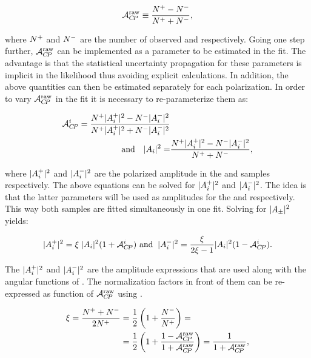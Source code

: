 \begin{equation}
\mathcal{A}_{C\!P}^{\text{raw}} \equiv \frac{{N^+} - {N^-}}{{N^+} + {N^-}},
\label{acp_mes}
\end{equation}

\noindent where ${N^+}$ and ${N^-}$ are the number of observed \BsbarJpsiKst and \BsJpsiKst respectively.
Going one step further, $\mathcal{A}_{C\!P}^{\text{raw}}$ can be implemented as a parameter to be estimated in the fit. The advantage
is that the statistical uncertainty propagation for these parameters is implicit in the likelihood thus avoiding
explicit calculations. In addition, the above quantities can then be estimated separately for each polarization.
In order to vary $\mathcal{A}_{C\!P}^{\text{raw}}$ in the fit it is necessary to re-parameterize them as:

\begin{align}
  \label{acp_param}
\mathcal{A}_{C\!P}^{i} = \frac{{N^+}|{A}_{i}^+|^2 - {N^-}|{A}_{i}^-|^2}{{N^+}|{A}_{i}^+|^2 + {N^-}|{A}_{i}^-|^2 } & \\
\text{and} \quad |{A}_{i}|^2 = &\frac{ {N^+} |{A}_{i}^+|^2 - {N^-}|{A}_{i}^-|^2}{{N^+} + {N^-}},
\end{align}

\noindent where $|{A}_{i}^+|^2$ and $|{A}_{i}^-|^2$ are the polarized amplitude in the \BsbarJpsiKst
and \BsJpsiKst samples respectively. The above equations can be solved for $|{A}_{i}^+|^2$ and $|{A}_{i}^-|^2$. The idea
is that the latter parameters will be used as amplitudes for the \BsbarJpsiKst and \BsJpsiKst \pdfs respectively.
This way both samples are fitted simultaneously in one fit. Solving  for $|{A}_{\pm}|^2$ yields:

\begin{equation}
|{A}_{i}^+|^2 = \xi \; |{A}_{i}|^2 (1+\mathcal{A}_{C\!P}^{i}) \,\, \text{and}\;\; |{A}_{i}^-|^2 = \frac{\xi}{2\xi-1} |{A}_{i}|^2 (1-\mathcal{A}_{C\!P}^{i}).
\label{acp_free}
\end{equation}

\noindent The $|{A}_{i}^+|^2$ and $|{A}_{i}^-|^2$ are the amplitude expressions that are used along with the angular functions of .
The normalization factors in front of them can be re-expressed as function of $\mathcal{A}_{C\!P}^{\text{raw}}$ using .

\begin{align}
\xi = \frac{{N^+}+{N^-}}{2{N^+}} &= \frac{1}{2}\left( 1 + \frac{N^{-}_{}}{N^{+}_{}}\right) = \nonumber \\
                                     &= \frac{1}{2}\left( 1 + \frac{1-\mathcal{A}_{C\!P}^{\text{raw}}}{1+\mathcal{A}_{C\!P}^{\text{raw}}}\right) =
                                        \frac{1}{1+\mathcal{A}_{C\!P}^{\text{raw}}},
\label{amp_norms_plu}
\end{align}

